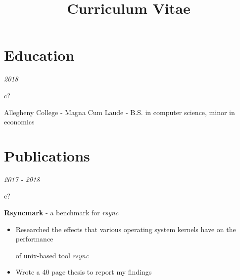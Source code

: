 \documentclass[12pt,a4paper,sans]{moderncv} %
\title{Curriculum Vitae}
\begin{document}
\begin{comment}
\hspace{2 mm}
\textit{2018}
\hspace{2 mm}
\begin{tabular}{c?}
 \\
\end{tabular}
 \hspace{2 mm}
 \textbf{B.S. in Computer Science}, minor in Economics, Allegheny College - cumulative GPA: 3.80
\end{comment}

\makecvtitle %
\vspace{-16 mm}
\section{Education}
\hspace{11 mm}
\textit{2018}
\hspace{2 mm}
\begin{tabular}{c?}
 \\
\end{tabular}
 \hspace{2 mm}
Allegheny College - Magna Cum Laude - B.S. in computer science, minor in economics

 
\vspace{-4 mm}
\section{Publications}

\textit{2017 - 2018}
\hspace{2 mm}
\begin{tabular}{c?}
 \\
\end{tabular}
 \hspace{2 mm} \textbf{Rsyncmark} - a benchmark for \textit{rsync} 
 
 \begin{itemize}
 \addtolength{\itemindent}{31.7 mm} 
  \item Researched the effects that various operating system kernels have on the performance 
 
  \hspace{30.5 mm} of  unix-based tool \textit{rsync}
 \item{Wrote a 40 page thesis to report my findings }
 \end{itemize}
 
\end{document}
